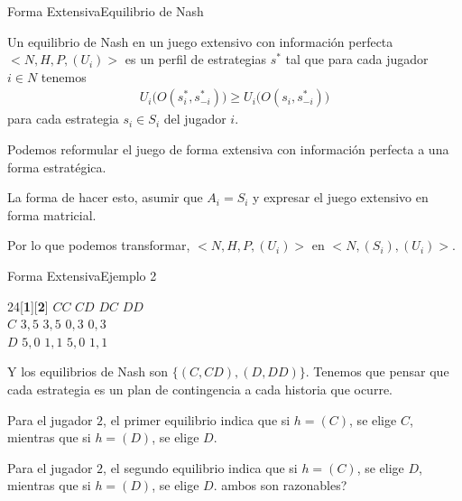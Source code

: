 \documentclass[notes, 11pt]{beamer} %
\newenvironment{wideitemize}{\itemize\addtolength{\itemsep}{10pt}}{\enditemize}
\begin{document}
\begin{frame}{Forma Extensiva}{Equilibrio de Nash}
	\begin{wideitemize}
		\item<1-> Un equilibrio de Nash en un juego extensivo con informaci\'on perfecta $\big< N, H, P, (U_{i}) \big>$ es un perfil de estrategias $s^{*}$ tal que para cada jugador $i \in N$ tenemos
		\begin{align*}
			U_{i} \Big(O(s_{i}^{*},s_{-i}^{*}) \Big) \geq U_{i} \Big(O(s_{i},s_{-i}^{*}) \Big)
		\end{align*} para cada estrategia $s_{i} \in S_{i}$ del jugador $i$.
		\item<2-> Podemos reformular el juego de forma extensiva con informaci\'on perfecta a una forma estrat\'egica.
		\begin{wideitemize}
			\item<3->[--] La forma de hacer esto, asumir que $A_{i} = S_{i}$ y expresar el juego extensivo en forma matricial.
			\item<4->[--] Por lo que podemos transformar, $\big< N, H, P, (U_{i}) \big>$ en $\big< N, (S_{i}), (U_{i}) \big>$.
		\end{wideitemize}
	\end{wideitemize}	
\end{frame}

\begin{frame}{Forma Extensiva}{Ejemplo 2}
	\begin{center}
	 \begin{game}{2}{4}[\textbf{1}][\textbf{2}]
                  \>$CC$        \>$CD$   \>$DC$  \>$DD$   \\
        $C$       \>$3,5$       \>$3,5$  \>$0,3$ \>$0,3$  \\
        $D$       \>$5,0$       \>$1,1$  \>$5,0$ \>$1,1$
 \end{game}
\end{center}

Y los equilibrios de Nash son $\{ (C,CD), (D,DD) \}$. Tenemos que pensar que cada estrategia es un plan de contingencia a cada historia que ocurre. 
\begin{wideitemize}
	\item Para el jugador $2$, el primer equilibrio indica que si $h=(C)$, se elige $C$, mientras que si $h=(D)$, se elige $D$.
	\item Para el jugador $2$, el segundo equilibrio indica que si $h=(C)$, se elige $D$, mientras que si $h=(D)$, se elige $D$.
\end{wideitemize} ambos son razonables?
\end{frame}
\end{document}
